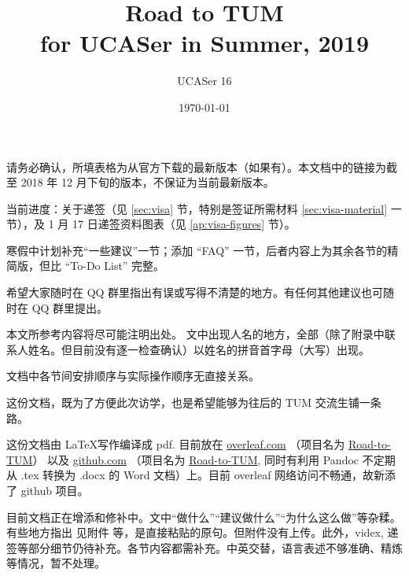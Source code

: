 \documentclass[final]{book}
\title{Road to TUM\\for UCASer in Summer, 2019}
\author{UCASer 16}
\date{\today}
\begin{document}
\maketitle

请务必确认，所填表格为从官方下载的最新版本（如果有）。本文档中的链接为截至 2018 年 12 月下旬的版本，不保证为当前最新版本。

当前进度：关于递签（见 \ref{sec:visa} 节，特别是签证所需材料 \ref{sec:visa-material} 一节），及 1 月 17 日递签资料图表（见 \ref{ap:visa-figures} 节）。

寒假中计划补充“一些建议”一节；添加 ``FAQ'' 一节，后者内容上为其余各节的精简版，但比 ``To-Do List'' 完整。

希望大家随时在 QQ 群里指出有误或写得不清楚的地方。有任何其他建议也可随时在 QQ 群里提出。


本文所参考内容将尽可能注明出处。%
文中出现人名的地方，全部（除了附录中联系人姓名。但目前没有逐一检查确认）以姓名的拼音首字母（大写）出现。

文档中各节间安排顺序与实际操作顺序无直接关系。
\vfill

这份文档，既为了方便此次访学，也是希望能够为往后的 TUM 交流生铺一条路。

这份文档由 \LaTeX 写作编译成 pdf. 目前放在 \href{https://www.overlear.com}{overleaf.com} （项目名为 \href{https://www.overleaf.com/2269426218fxwmgyxjywnn}{Road-to-TUM}） 以及 \href{https://github.com}{github.com} （项目名为 \href{https://github.com/Memcys/Road-to-TUM.git}{Road-to-TUM}, 同时有利用 Pandoc 不定期从 .tex 转换为 .docx 的 Word 文档）上。目前 overleaf 网络访问不畅通，故新添了 github 项目。


目前文档正在增添和修补中。文中“做什么”“建议做什么”“为什么这么做”等杂糅。有些地方指出 见附件 等，是直接粘贴的原句。但附件没有上传。此外，videx, 递签等部分细节仍待补充。各节内容都需补充。中英交替，语言表述不够准确、精炼等情况，暂不处理。
\end{document}
